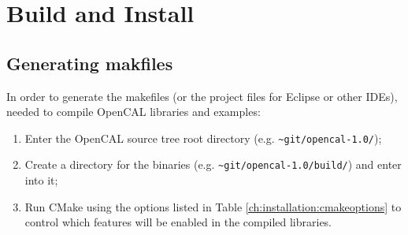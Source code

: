 


\section{Build and Install}

\subsection{Generating makfiles}

In order to generate the makefiles (or the project files for Eclipse or other IDEs), needed to compile OpenCAL libraries and examples:

\begin{enumerate}
\item Enter the OpenCAL source tree root directory (e.g. \verb'~git/opencal-1.0/');
\item Create a directory for the binaries
  (e.g. \verb'~git/opencal-1.0/build/') and enter into it;
\item Run CMake using the options listed in Table
  \ref{ch:installation:cmakeoptions} to control which features will be
  enabled in the compiled libraries.
\end{enumerate}

